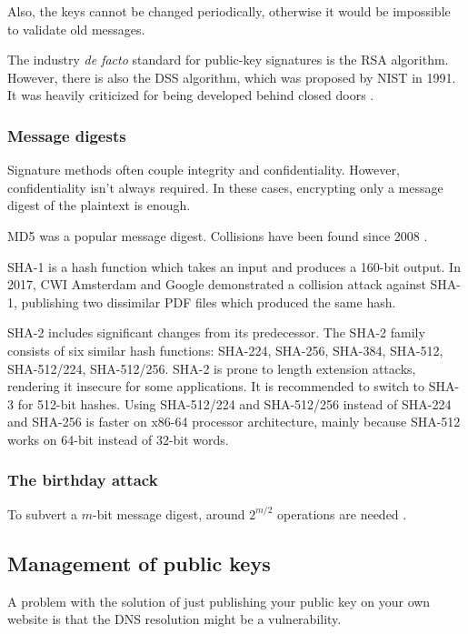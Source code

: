 Also, the keys cannot be changed periodically, otherwise it would be impossible to validate old messages.

The industry \textit{de facto} standard for public-key signatures is the RSA algorithm.
However, there is also the DSS algorithm, which was proposed by NIST in 1991.
It was heavily criticized for being developed behind closed doors \cite[p.~800]{computer-networks-tanenbaum-2012}.

\subsubsection{Message digests}

Signature methods often couple integrity and confidentiality. However, confidentiality isn't always required.
In these cases, encrypting only a message digest of the plaintext is enough.

MD5 was a popular message digest. Collisions have been found since 2008 \cite[p.~804]{computer-networks-tanenbaum-2012}.

SHA-1 is a hash function which takes an input and produces a 160-bit output.
In 2017, CWI Amsterdam and Google demonstrated a collision attack against SHA-1, publishing two dissimilar PDF files which produced the same hash.

SHA-2 includes significant changes from its predecessor. The SHA-2 family consists of six similar hash functions: SHA-224, SHA-256, SHA-384, SHA-512, SHA-512/224, SHA-512/256.
SHA-2 is prone to length extension attacks, rendering it insecure for some applications.
It is recommended to switch to SHA-3 for 512-bit hashes.
Using SHA-512/224 and SHA-512/256 instead of SHA-224 and SHA-256 is faster on x86-64 processor architecture, mainly because SHA-512 works on 64-bit instead of 32-bit words.

\subsubsection{The birthday attack}

To subvert a \(m\)-bit message digest, around \(2^{m/2}\) operations are needed \cite[p.~804]{computer-networks-tanenbaum-2012}.

\subsection{Management of public keys}

A problem with the solution of just publishing your public key on your own website is that the DNS resolution might be a vulnerability.

